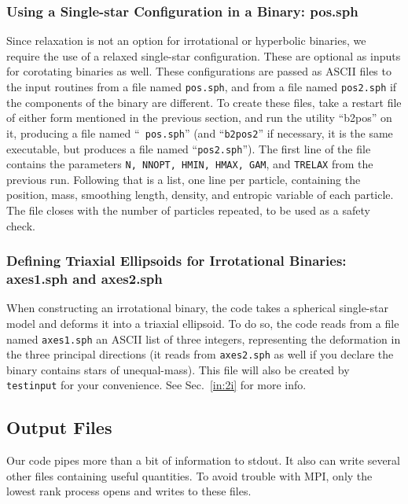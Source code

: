 \subsubsection{Using a Single-star Configuration in a Binary: pos.sph}
Since relaxation is not an option for irrotational or hyperbolic
binaries, we require the use of a relaxed single-star configuration.
These are optional as inputs for corotating binaries as well.  These
configurations are passed as ASCII files to the input routines from a
file named {\tt pos.sph}, and from a file named {\tt pos2.sph} if the
components of the binary are different.  To create these files, take
a restart file of either form mentioned in the previous section, and
run the utility ``{b2pos}'' on it, producing a file named ``{\tt
pos.sph}'' (and ``{\tt b2pos2}'' if necessary,
it is the same executable, but produces a file named ``{\tt pos2.sph}'').
The first line of the file contains the parameters {\tt N, NNOPT,
HMIN, HMAX, GAM}, and {\tt TRELAX} from the previous run.  Following
that is a list, one line per particle, containing the position, mass,
smoothing length, density, and entropic variable of each particle.  The
file closes with the number of particles repeated, to be used as a
safety check.

\subsubsection{Defining Triaxial Ellipsoids for Irrotational Binaries: axes1.sph and axes2.sph}
When constructing an irrotational binary, the code takes a spherical
single-star model and deforms it into a triaxial ellipsoid.  To do so,
the code reads from a file named {\tt axes1.sph} an ASCII list of
three integers, representing the deformation in the three principal
directions (it reads from {\tt axes2.sph} as well if you declare the
binary contains stars of unequal-mass). This file will also be created
by {\tt testinput} for your convenience.  See Sec.~\ref{in:2i} for
more info.

\subsection{Output Files}\label{io:ou}
Our code pipes more than a bit of information to stdout.  It also can
write several other files containing useful quantities.  To avoid
trouble with MPI, only the lowest rank process opens and writes to
these files.

